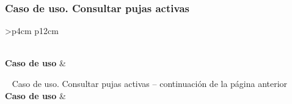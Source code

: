 \subsubsection{Caso de uso. Consultar pujas activas} \label{sec:cu_consultar-pujas}
\begin{longtable}{
    >{}p{4cm}
    p{12cm}
    }
    \caption{Caso de uso. Consultar pujas activas} \label{table:cu_consultar-pujas} \\
    \toprule
    \textbf{Caso de uso} &  \\
    \endfirsthead
    
    {{ \tablename\ \thetable{} Caso de uso. Consultar pujas activas -- continuación de la página anterior}} \\
    \toprule
    \textbf{Caso de uso} &  \\
    \midrule
    \endhead
    
    \midrule
     \\ 
    \endfoot
    
    \bottomrule
    \endlastfoot
    

\end{longtable}
